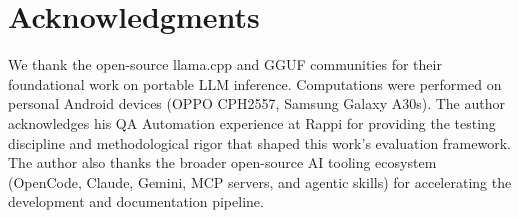 \documentclass[11pt]{article}
\begin{document}
\section*{Acknowledgments}
We thank the open-source llama.cpp and GGUF communities for
their foundational work on portable LLM inference. Computations
were performed on personal Android devices (OPPO CPH2557,
Samsung Galaxy A30s). The author acknowledges his QA Automation
experience at Rappi for providing the testing discipline and
methodological rigor that shaped this work's evaluation framework.
The author also thanks the broader open-source AI tooling ecosystem
(OpenCode, Claude, Gemini, MCP servers, and agentic skills) for
accelerating the development and documentation pipeline.



\end{document}
